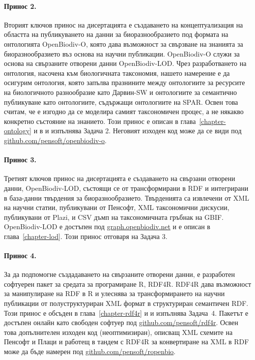 \paragraph{Принос 2.} Вторият ключов принос на дисертацията е създаването на концептуализация на областта на публикуването на данни за биоразнообразието под формата на онтологията OpenBiodiv-O, която дава възможност за свързване на знанията за биоразнообразието въз основа на научни публикации. OpenBiodiv-O служи за основа на свързаните отворени данни OpenBiodiv-LOD. Чрез разработването на онтология, насочена към биологичната таксономия, нашето намерение е да осигурим онтология, която запълва празнините между онтологиите за ресурсите на биологичното разнообразие като Дарвин-SW и онтологиите за семантично публикуване като онтологиите, съдържащи онтологиите на SPAR. Освен това считам, че е изгодно да се моделира самият таксономичен процес, а не някакво конкретно състояние на знанието. Този принос е описан в глава~\ref{chapter-ontology} и в \cite{senderov_openbiodiv-o:_2018} и изпълнява Задача 2. Неговият изходен код може да се види под \href{https://github.com/pensoft/openbiodiv-o}{github.com/pensoft/openbiodiv-o}.

\paragraph{Принос 3.} Третият ключов принос на дисертацията е създаването на свързани отворени данни, OpenBiodiv-LOD, състоящи се от трансформирани в RDF и интегрирани в база-данни твърдения за биоразнообразието. Твърденията са извлечени от XML на научни статии, публикувани от Пенсофт, XML таксономични дискусии, публикувани от Plazi, и CSV дъмп на таксономичната гръбнак на GBIF. OpenBiodiv-LOD е достъпен под \href{http://graph.openbiodiv.net}{\url{graph.openbiodiv.net}} и е описан в глава~\ref{chapter-lod}. Този принос отговаря на Задача 3.

\paragraph{Принос 4.} За да подпомогне създадаването на свързаните отворени данни, е разработен софтуерен пакет за средата за програмиране R, RDF4R. RDF4R дава възможност за манипулиране на RDF в R и улеснява за трансформирането на научни публикации от полуструктуриран XML формат в структуриран семантичен RDF. Този принос е обсъден в глава~\ref{chapter-rdf4r} и \cite{senderov_online_2016} и изпълнява Задача~4. Пакетът е достъпен онлайн като свободен софтуер под \href{http://github.com/pensoft/rdf4r}{github.com/pensoft/rdf4r}. Освен това допълнителен изходен код (неоптимизиран), описващ XML схемите на Пенсофт и Плаци и работещ в тандем с RDF4R за конвертиране на XML в RDF може да бъде намерен под \href{http://github.com/pensoft/ropenbio}{github.com/pensoft/ropenbio}.

